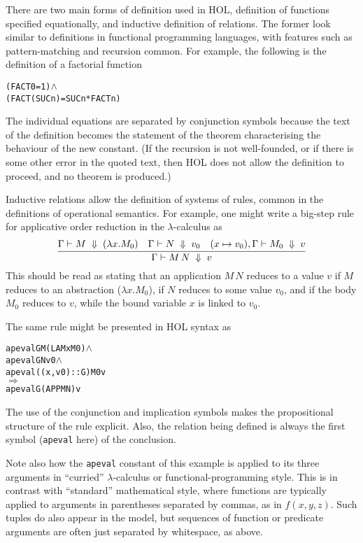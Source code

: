 \documentclass[11pt]{article}
\begin{document}
There are two main forms of definition used in HOL, definition of
functions specified equationally, and inductive definition of
relations.  The former look similar to definitions in functional
programming languages, with features such as pattern-matching and
recursion common.  For example, the following is the definition of a
factorial function
\begin{alltt}
   (FACT 0 = 1) \(\land\)
   (FACT (SUC n) = SUC n * FACT n)
\end{alltt}
The individual equations are separated by conjunction symbols because
the text of the definition becomes the statement of the theorem
characterising the behaviour of the new constant.  (If the recursion
is not well-founded, or if there is some other error in the quoted
text, then HOL does not allow the definition to proceed, and no
theorem is produced.)

Inductive relations allow the definition of systems of rules, common
in the definitions of operational semantics.  For example, one might
write a big-step rule for applicative order reduction in the
$\lambda$-calculus as
\[
\infer{\Gamma \vdash M\,N\;\Downarrow \;v}{\Gamma \vdash M \;\Downarrow\; (\lambda x. M_0) &
  \Gamma \vdash N \;\Downarrow\;v_0 & (x\mapsto v_0),\Gamma \vdash M_0 \;\Downarrow\; v}
\]
This should be read as stating that an application $M\,N$ reduces to a
value $v$ if $M$ reduces to an abstraction ($\lambda x. M_0$), if $N$
reduces to some value $v_0$, and if the body $M_0$ reduces to $v$,
while the bound variable $x$ is linked to $v_0$.

The same rule might be presented in HOL syntax as
\begin{alltt}
     apeval G M (LAM x M0) \(\land\)
     apeval G N v0 \(\land\)
     apeval ((x,v0) :: G) M0 v
   \(\Rightarrow\)
     apeval G (APP M N) v
\end{alltt}
The use of the conjunction and implication symbols makes the
propositional structure of the rule explicit.  Also, the relation
being defined is always the first symbol (\texttt{apeval} here) of the
conclusion.

Note also how the \texttt{apeval} constant of this example is applied
to its three arguments in ``curried'' $\lambda$-calculus or
functional-programming style.  This is in contrast with ``standard''
mathematical style, where functions are typically applied to arguments
in parentheses separated by commas, as in $f(x,y,z)$.  Such tuples do
also appear in the model, but sequences of function or predicate
arguments are often just separated by whitespace, as above.
\end{document}
